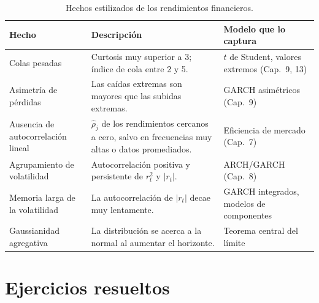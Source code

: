 \begin{table}[ht]
\centering\small
\begin{tabularx}{\linewidth}{@{}>{\raggedright\arraybackslash}p{3.6cm}X>{\raggedright\arraybackslash}p{2.6cm}@{}}
\toprule
Hecho & Descripción & Modelo que lo captura \\
\midrule
Colas pesadas & Curtosis muy superior a 3; índice de cola entre 2 y 5. & $t$ de Student, valores extremos (Cap.~9, 13) \\
Asimetría de pérdidas & Las caídas extremas son mayores que las subidas extremas. & GARCH asimétricos (Cap.~9) \\
Ausencia de autocorrelación lineal & $\hat\rho_j$ de los rendimientos cercanos a cero, salvo en frecuencias muy altas o datos promediados. & Eficiencia de mercado (Cap.~7) \\
Agrupamiento de volatilidad & Autocorrelación positiva y persistente de $r_t^2$ y $|r_t|$. & ARCH/GARCH (Cap.~8) \\
Memoria larga de la volatilidad & La autocorrelación de $|r_t|$ decae muy lentamente. & GARCH integrados, modelos de componentes \\
Gaussianidad agregativa & La distribución se acerca a la normal al aumentar el horizonte. & Teorema central del límite \\
\bottomrule
\end{tabularx}
\caption{Hechos estilizados de los rendimientos financieros.}
\label{tab:hechos}
\end{table}

\section{Ejercicios resueltos}


